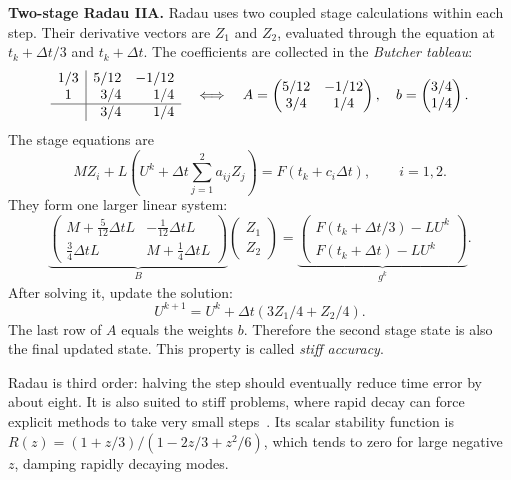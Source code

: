 \documentclass[11pt,a4paper]{article}
\begin{document}
\textbf{Two-stage Radau IIA.} Radau uses two coupled stage calculations within each step. Their derivative vectors are $Z_1$ and $Z_2$, evaluated through the equation at $t_k+\Delta t/3$ and $t_k+\Delta t$. The coefficients are collected in the \emph{Butcher tableau}:
\begin{equation}
\begin{array}{c|rr}
1/3&5/12&-1/12\\
1&3/4&1/4\\\hline
&3/4&1/4
\end{array}
\quad\Longleftrightarrow\quad
A=\begin{pmatrix}5/12&-1/12\\3/4&1/4\end{pmatrix},\quad
b=\begin{pmatrix}3/4\\1/4\end{pmatrix}.
\end{equation}
The stage equations are
\begin{equation}
MZ_i+L\left(U^k+\Delta t\sum_{j=1}^2a_{ij}Z_j\right)
      =F(t_k+c_i\Delta t),\qquad i=1,2.
\end{equation}
They form one larger linear system:
\begin{equation}
\underbrace{\begin{pmatrix}
M+\frac5{12}\Delta t L&-\frac1{12}\Delta t L\\
\frac34\Delta t L&M+\frac14\Delta t L
\end{pmatrix}}_{B}
\begin{pmatrix}Z_1\\Z_2\end{pmatrix}
=\underbrace{\begin{pmatrix}F(t_k+\Delta t/3)-LU^k\\F(t_k+\Delta t)-LU^k\end{pmatrix}}_{g^k}.
\end{equation}
After solving it, update the solution:
\begin{equation}
U^{k+1}=U^k+\Delta t(3Z_1/4+Z_2/4).
\end{equation}
The last row of $A$ equals the weights $b$. Therefore the second stage state is also the final updated state. This property is called \emph{stiff accuracy}.

Radau is third order: halving the step should eventually reduce time error by about eight. It is also suited to stiff problems, where rapid decay can force explicit methods to take very small steps~\cite{hairer}. Its scalar stability function is $R(z)=(1+z/3)/(1-2z/3+z^2/6)$, which tends to zero for large negative $z$, damping rapidly decaying modes.
\end{document}
